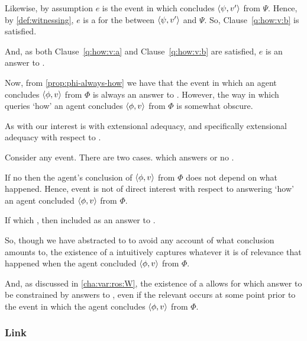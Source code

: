 \begin{note}
\begin{proposition}
\begin{argument}
      Likewise, by assumption \(e\) is the event in which \vAgent{} concludes \(\langle \psi, v' \rangle\) from \(\Psi\).
      Hence, by \autoref{def:witnessing}, \(e\) is a \wit{} for the \ros{} between \(\langle \psi, v' \rangle\) and \(\Psi\).
      So, Clause~\ref{q:how:v:b} is satisfied.

      And, as both Clause~\ref{q:how:v:a} and Clause~\ref{q:how:v:b} are satisfied, \(e\) is an answer to \qHowV{}.
    \end{argument}
  \end{proposition}
\end{note}

\begin{note}
  Now, from \autoref{prop:phi-always-how} we have that the event in which an agent concludes \(\langle \phi, v \rangle\) from \(\Phi\) is always an answer to \qHowV{}.
  However, the way in which \qHowV{} queries `how' an agent concludes \(\langle \phi, v \rangle\) from \(\Phi\) is somewhat obscure.

  As with \qWhyVnP{} our interest is with extensional adequacy, and specifically extensional adequacy with respect to .

  Consider any event.
  There are two cases.
  \ros{} which answers \qWhyVnP{} or no \ros{}.

  If no \ros{} then the agent's conclusion of \(\langle \phi, v \rangle\) from \(\Phi\) does not depend on what happened.
  Hence, event is not of direct interest with respect to answering `how' an agent concluded \(\langle \phi, v \rangle\) from \(\Phi\).

  If \ros{} which \qWhyVnP{}, then included as an answer to \qHowV{}.

  So, though we have abstracted to  to avoid any account of what conclusion amounts to, the existence of a  intuitively captures whatever it is of relevance that happened when the agent concluded \(\langle \phi, v \rangle\) from \(\Phi\).

  And, as discussed in \autoref{cha:var:ros:W}, the existence of a  allows for \ros{} which answer \qWhyVnP{} to be constrained by answers to \qHowV{}, even if the relevant  occurs at some point prior to the event in which the agent concludes \(\langle \phi, v \rangle\) from \(\Phi\).
\end{note}

\subsubsection{Link}
\label{cha:var:sec:vars:qhowv:sec:link}

